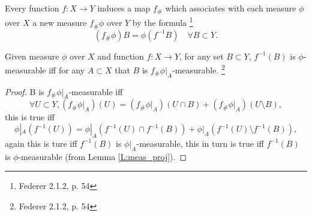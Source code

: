 \begin{definition} \label{D:meas_map}
Every function $f:X\to Y$ induces a map $f_\#$ which associates with each
measure $\phi$ over $X$ a new measure $f_\#\phi$ over $Y$ by the formula
\footnote{Federer 2.1.2, p. 54}
\[
  (f_\# \phi)B= \phi(f^{-1}B) \quad \forall B\subset Y.
\]
\end{definition}

\begin{proposition}
Given measure $\phi$ over $X$ and function $f:X\to Y$, for any set $B\subset Y$,
$f^{-1}(B)$ is $\phi$-measurable iff for any $A\subset X$ that $B$ is
$f_\# \phi|_A$-measurable.
\footnote{Federer 2.1.2, p. 54}
\end{proposition}

\begin{proof}
B is $f_\# \phi|_A$-measurable iff
\[
  \forall U\subset Y, 
  (f_\#\phi|_A)(U)=(f_\#\phi|_A)(U\cap B) + (f_\#\phi|_A)(U\setminus B), 
\]
this is true iff
\[
  \phi|_A(f^{-1}(U)) = \phi|_A(f^{-1}(U)\cap f^{-1}(B))
                      +  \phi|_A(f^{-1}(U)\setminus f^{-1}(B)),
\]
again this is ture iff $f^{-1}(B)$ is $\phi|_A$-measurable, this in turn is true
iff $f^{-1}(B)$ is $\phi$-measurable (from Lemma \ref{L:meas_proj}).

\end{proof}


